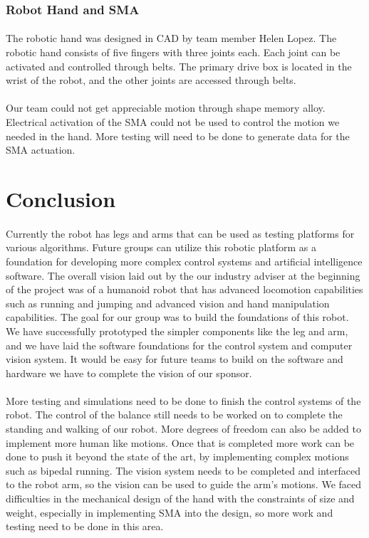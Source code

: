 \documentclass[titlepage,letterpaper,12pt]{article}
\begin{document}
\subsubsection{Robot Hand and SMA}
\paragraph{}The robotic hand was designed in CAD by team member Helen Lopez. The
robotic hand consists of five fingers with three joints each. Each joint can be
activated and controlled through belts. The primary drive box is located in the
wrist of the robot, and the other joints are accessed through belts. 

\paragraph{}Our team could not get appreciable motion through shape memory
alloy. Electrical activation of the SMA could not be used to control the motion
we needed in the hand. More testing will need to be done to generate data for
the SMA actuation.

\section{Conclusion}
\paragraph{}Currently the robot has legs and arms that can be used as testing
platforms for various algorithms. Future groups can utilize this robotic
platform as a foundation for developing more complex control systems and
artificial intelligence software. The overall vision laid out by the our
industry adviser at the beginning of the project was of a humanoid robot that
has advanced locomotion capabilities such as running and jumping and advanced
vision and hand manipulation capabilities. The goal for our group was to build
the foundations of this robot. We have successfully prototyped the simpler
components like the leg and arm, and we have laid the software foundations for
the control system and computer vision system. It would be easy for future teams
to build on the software and hardware we have to complete the vision of our
sponsor.

\paragraph{}More testing and simulations need to be done to finish the control
systems of the robot. The control of the balance still needs to be worked on to
complete the standing and walking of our robot. More degrees of freedom can also
be added to implement more human like motions. Once that is completed more work
can be done to push it beyond the state of the art, by implementing complex
motions such as bipedal running. The vision system needs to be completed and
interfaced to the robot arm, so the vision can be used to guide the arm's
motions. We faced difficulties in the mechanical design of the hand with the
constraints of size and weight, especially in implementing SMA into the design,
so more work and testing need to be done in this area.
\end{document}
